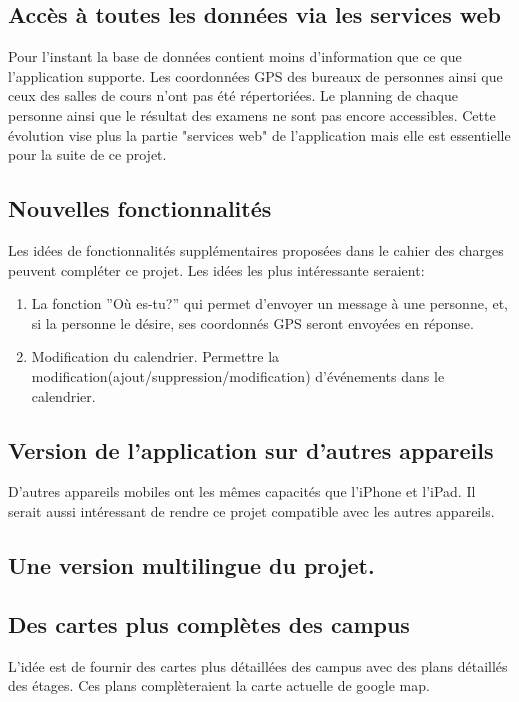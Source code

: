 \documentclass[12pt,a4paper,twoside]{report}
\begin{document}
\subsection{Accès à toutes les données via les services web }  
Pour l'instant la base de données contient moins d'information que ce que l'application supporte. Les coordonnées GPS des bureaux de personnes ainsi que ceux des salles de cours n'ont pas été répertoriées. Le planning de chaque personne ainsi que le résultat des examens ne sont pas encore accessibles.
Cette évolution vise plus la partie "services web" de l'application mais elle est essentielle pour la suite de ce projet.

\subsection{Nouvelles fonctionnalités } 
Les idées de fonctionnalités supplémentaires proposées dans le cahier des charges peuvent compléter ce projet. Les idées les plus intéressante seraient:
\begin{enumerate}
\item La fonction ''Où es-tu?'' qui permet d'envoyer un message à une personne, et, si la personne le désire, ses coordonnés GPS seront envoyées en réponse.  
\item Modification du calendrier. Permettre la modification(ajout/suppression/modification) d'événements dans le calendrier.
\end{enumerate}

\subsection{Version de l'application sur d'autres appareils}
D'autres appareils mobiles ont les mêmes capacités que l'iPhone et l'iPad. Il serait aussi intéressant de rendre ce projet compatible avec les autres appareils. 

\subsection{Une version multilingue du projet.}
\subsection{Des cartes plus complètes des campus}
L'idée est de fournir des cartes plus détaillées des campus avec des plans détaillés des étages. Ces plans complèteraient la carte actuelle de google map. 
\end{document}

